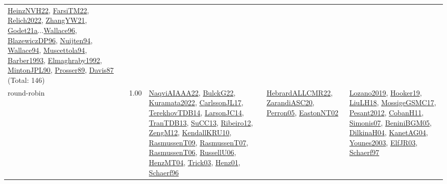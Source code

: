 {\begin{longtable}{p{3cm}r>{\raggedright\arraybackslash}p{6cm}>{\raggedright\arraybackslash}p{6cm}>{\raggedright\arraybackslash}p{8cm}}
\hyperref[detail:HeinzNVH22]{HeinzNVH22}, \hyperref[detail:FarsiTM22]{FarsiTM22}, \hyperref[detail:Relich2022]{Relich2022}, \hyperref[detail:ZhangYW21]{ZhangYW21}, \hyperref[detail:Godet21a]{Godet21a}...\hyperref[detail:Wallace96]{Wallace96}, \hyperref[detail:BlazewiczDP96]{BlazewiczDP96}, \hyperref[detail:Nuijten94]{Nuijten94}, \hyperref[detail:Wallace94]{Wallace94}, \hyperref[detail:Muscettola94]{Muscettola94}, \hyperref[detail:Barber1993]{Barber1993}, \hyperref[detail:Elmaghraby1992]{Elmaghraby1992}, \hyperref[detail:MintonJPL90]{MintonJPL90}, \hyperref[detail:Prosser89]{Prosser89}, \hyperref[detail:Davis87]{Davis87} (Total: 146)\\
\index{round-robin}\index{ApplicationAreas!round-robin}round-robin &  1.00 & \hyperref[detail:NaqviAIAAA22]{NaqviAIAAA22}, \hyperref[detail:BulckG22]{BulckG22}, \hyperref[detail:Kuramata2022]{Kuramata2022}, \hyperref[detail:CarlssonJL17]{CarlssonJL17}, \hyperref[detail:TerekhovTDB14]{TerekhovTDB14}, \hyperref[detail:LarsonJC14]{LarsonJC14}, \hyperref[detail:TranTDB13]{TranTDB13}, \hyperref[detail:SuCC13]{SuCC13}, \hyperref[detail:Ribeiro12]{Ribeiro12}, \hyperref[detail:ZengM12]{ZengM12}, \hyperref[detail:KendallKRU10]{KendallKRU10}, \hyperref[detail:RasmussenT09]{RasmussenT09}, \hyperref[detail:RasmussenT07]{RasmussenT07}, \hyperref[detail:RasmussenT06]{RasmussenT06}, \hyperref[detail:RussellU06]{RussellU06}, \hyperref[detail:HenzMT04]{HenzMT04}, \hyperref[detail:Trick03]{Trick03}, \hyperref[detail:Henz01]{Henz01}, \hyperref[detail:Schaerf96]{Schaerf96} & \hyperref[detail:HebrardALLCMR22]{HebrardALLCMR22}, \hyperref[detail:ZarandiASC20]{ZarandiASC20}, \hyperref[detail:Perron05]{Perron05}, \hyperref[detail:EastonNT02]{EastonNT02} & \hyperref[detail:Lozano2019]{Lozano2019}, \hyperref[detail:Hooker19]{Hooker19}, \hyperref[detail:LiuLH18]{LiuLH18}, \hyperref[detail:MossigeGSMC17]{MossigeGSMC17}, \hyperref[detail:Pesant2012]{Pesant2012}, \hyperref[detail:CobanH11]{CobanH11}, \hyperref[detail:Simonis07]{Simonis07}, \hyperref[detail:BeniniBGM05]{BeniniBGM05}, \hyperref[detail:DilkinaH04]{DilkinaH04}, \hyperref[detail:KanetAG04]{KanetAG04}, \hyperref[detail:Younes2003]{Younes2003}, \hyperref[detail:ElfJR03]{ElfJR03}, \hyperref[detail:Schaerf97]{Schaerf97}\\

\end{longtable}}
